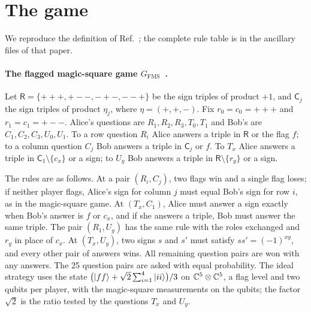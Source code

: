 \section{The game}\label{app:game}

We reproduce the definition of Ref.~\cite[Section~2.1]{TG}; the complete rule table is in the
ancillary files of that paper.

\paragraph{The flagged magic-square game $G_{\mathrm{FMS}}$~\cite{Mancinska26}.} Let
$\mathsf{R}=\{{+}{+}{+},{+}{-}{-},{-}{+}{-},{-}{-}{+}\}$ be the sign triples of product $+1$, and
$\mathsf{C}_j$ the sign triples of product $\eta_j$, where $\eta=(+,+,-)$. Fix
$r_0=c_0={+}{+}{+}$ and $r_1=c_1={+}{-}{-}$. Alice's questions are $R_1,R_2,R_3,T_0,T_1$ and
Bob's are $C_1,C_2,C_3,U_0,U_1$. To a row question $R_i$ Alice answers a triple in
$\mathsf{R}$ or the flag $f$; to a column question $C_j$ Bob answers a triple in $\mathsf{C}_j$
or $f$. To $T_x$ Alice answers a triple in $\mathsf{C}_1\setminus\{c_x\}$ or a sign; to $U_y$
Bob answers a triple in $\mathsf{R}\setminus\{r_y\}$ or a sign.

The rules are as follows. At a pair $(R_i,C_j)$, two flags win and a single flag loses; if
neither player flags, Alice's sign for column $j$ must equal Bob's sign for row $i$, as in the
magic-square game. At $(T_x,C_1)$, Alice must answer a sign exactly when Bob's answer is $f$ or
$c_x$, and if she answers a triple, Bob must answer the same triple. The pair $(R_1,U_y)$ has
the same rule with the roles exchanged and $r_y$ in place of $c_x$. At $(T_x,U_y)$, two signs
$s$ and $s'$ must satisfy $ss'=(-1)^{xy}$, and every other pair of answers wins. All remaining
question pairs are won with any answers. The 25 question pairs are asked with equal probability. The ideal strategy uses the state
$\bigl(|ff\rangle+\sqrt2\sum_{i=1}^4|ii\rangle\bigr)/3$ on $\mathbb{C}^5\otimes\mathbb{C}^5$, a flag level and two
qubits per player, with the magic-square measurements on the qubits; the factor $\sqrt2$ is the
ratio tested by the questions $T_x$ and $U_y$.

